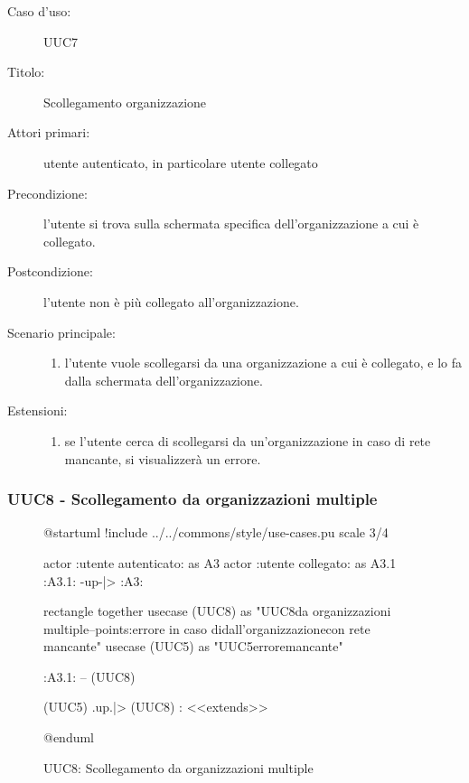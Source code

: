 \documentclass[casi-duso]{subfiles}
\begin{document}
\begin{description}
  \item[Caso d’uso:] UUC7
  \item[Titolo:] Scollegamento organizzazione
  \item[Attori primari:] utente autenticato, in particolare utente collegato
  \item[Precondizione:] l'utente si trova sulla schermata specifica dell'organizzazione a cui è collegato.
  \item[Postcondizione:] l'utente non è più collegato all'organizzazione.
  \item[Scenario principale:]
        \begin{enumerate}
          \item l'utente vuole scollegarsi da una organizzazione a cui è collegato, e lo fa dalla schermata dell'organizzazione.
        \end{enumerate}
  \item[Estensioni:]
        \begin{enumerate}
          \item se l'utente cerca di scollegarsi da un'organizzazione in caso di rete mancante, si visualizzerà un errore.
        \end{enumerate}
\end{description}

\subsubsection{UUC8 - Scollegamento da organizzazioni multiple}%
\label{subsub:UUC8utente}

\begin{figure}[h!] 
  \centering 
  \begin{plantuml}
  @startuml
  !include ../../commons/style/use-cases.pu
  scale 3/4

  actor :utente autenticato: as A3
  actor :utente collegato: as A3.1
  :A3.1: -up-|> :A3:

  rectangle {
    together {
      usecase (UUC8) as "UUC8\nScollegamento da organizzazioni multiple\n--\nExtension points:\nVisualizzazione errore in caso di\nscollegamento dall'organizzazione\n con rete mancante"
      usecase (UUC5) as "UUC5\nVisualizzazione errore\nrete mancante"
    }
  }

  :A3.1: -- (UUC8)

  (UUC5) .up.|> (UUC8) : <<extends>>

  @enduml
  \end{plantuml} 
  \caption{UUC8: Scollegamento da organizzazioni multiple} 
  \label{fig:uuc8} 
\end{figure}
\end{document}
